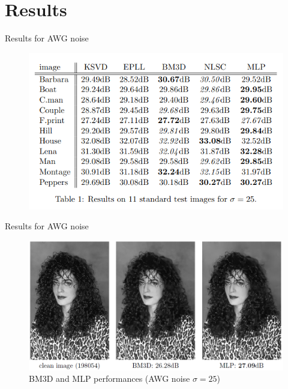 \documentclass[8pt]{beamer}
\begin{document}
\section{Results}

\begin{frame}{Results for AWG noise}

\begin{figure}[H]
    \begin{center}
        \includegraphics[scale=0.40]{../datasets/images/Table_dB.png}
    \end{center}
\end{figure}

\end{frame}

\begin{frame}{Results for AWG noise}

\begin{figure}[H]
    \begin{center}
        \includegraphics[scale=0.40]{../datasets/images/barbara.png}
        \caption{BM3D and MLP performances (AWG noise $\sigma = 25 $)}
    \end{center}
\end{figure}

\end{frame}
\end{document}
